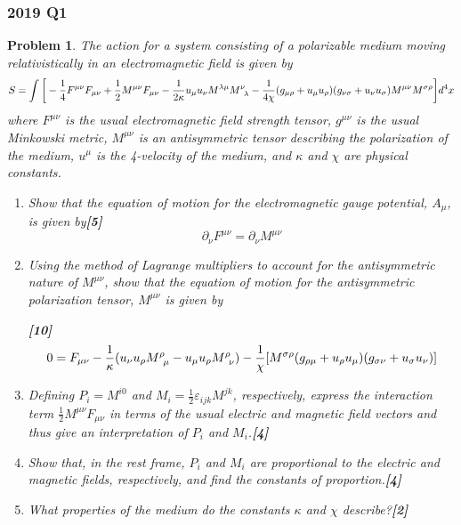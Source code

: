 \documentclass[a4paper]{article}
\theoremstyle{new}
\newtheorem{qns}{Problem}[section]
\begin{document}
\subsubsection*{2019 Q1}
\begin{qns}
The action for a system consisting of a polarizable medium moving relativistically in an electromagnetic field is given by
$$S=\int\bigg[-\frac{1}{4}F^{\mu\nu}F_{\mu\nu}+\frac{1}{2}M^{\mu\nu}F_{\mu\nu}-\frac{1}{2\kappa}u_\mu u_\nu M^{\lambda\mu}\tensor*{M}{*_{}^{\nu}_{\lambda}}-\frac{1}{4\chi}(g_{\mu\rho}+u_\mu u_\rho)(g_{\nu\sigma}+u_\nu u_\sigma)M^{\mu\nu}M^{\sigma\rho}\bigg]d^4x$$
where $F^{\mu\nu}$ is the usual electromagnetic field strength tensor, $g^{\mu\nu}$ is the usual Minkowski metric, $M^{\mu\nu}$ is an antisymmetric tensor describing the polarization of the medium, $u^\mu$ is the 4-velocity of the medium, and $\kappa$ and $\chi$ are physical constants.
\begin{enumerate}[label=(\alph*)]
\item Show that the equation of motion for the electromagnetic gauge potential, $A_\mu$, is given by\hfill\textbf{[5]}
$$\partial_\nu F^{\mu\nu}=\partial_\nu M^{\mu\nu}$$
\item Using the method of Lagrange multipliers to account for the antisymmetric nature of $M^{\mu\nu}$, show that the equation of motion for the antisymmetric polarization tensor, $M^{\mu\nu}$ is given by

\hfill\textbf{[10]}
$$0=F_{\mu\nu}-\frac{1}{\kappa}(u_\nu u_\rho\tensor*{M}{*_{}^{\rho}_{\mu}}-u_\mu u_\rho\tensor*{M}{*_{}^{\rho}_{\nu}})-\frac{1}{\chi}[M^{\sigma\rho}(g_{\rho\mu}+u_\rho u_\mu)(g_{\sigma\nu}+u_\sigma u_\nu)]$$
\item Defining $P_i=M^{i0}$ and $M_i=\frac{1}{2}\varepsilon_{ijk}M^{jk}$, respectively, express the interaction term $\frac{1}{2}M^{\mu\nu}F_{\mu\nu}$ in terms of the usual electric and magnetic field vectors and thus give an interpretation of $P_i$ and $M_i$.\hfill\textbf{[4]}
\item Show that, in the rest frame, $P_i$ and $M_i$ are proportional to the electric and magnetic fields, respectively, and find the constants of proportion.\hfill\textbf{[4]}
\item What properties of the medium do the constants $\kappa$ and $\chi$ describe?\hfill\textbf{[2]} 
\end{enumerate}
\end{qns}
\end{document}
